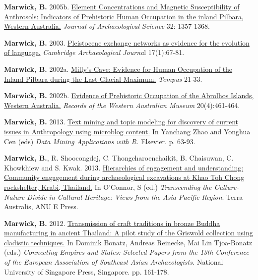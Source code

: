 \documentclass[11pt,article,oneside]{memoir}
\begin{document}
\ind \textbf{Marwick, B.} 2005b. \href{http://faculty.washington.edu/bmarwick/PDFs/Marwick_2005_JAS.pdf}{Element Concentrations and Magnetic Susceptibility of Anthrosols: Indicators of Prehistoric Human Occupation in the inland Pilbara, Western Australia.} \textit{Journal of Archaeological Science} 32: 1357-1368.

\ind \textbf{Marwick, B.} 2003. \href{http://faculty.washington.edu/bmarwick/PDFs/Marwick_2003_CAJ.pdf}{Pleistocene exchange networks as evidence for the evolution of language.} \textit{Cambridge Archaeological Journa}l 17(1):67-81. 

\ind \textbf{Marwick, B.} 2002a. \href{http://faculty.washington.edu/bmarwick/PDFs/Marwick_2002_Tempus.pdf}{Milly’s Cave: Evidence for Human Occupation of the Inland Pilbara during the Last Glacial Maximum.} \textit{Tempus} 21-33.

\ind \textbf{Marwick, B.} 2002b. \href{http://faculty.washington.edu/bmarwick/PDFs/Marwick_2002_RWAM.pdf}{Evidence of Prehistoric Occupation of the Abrolhos Islands, Western Australia.} \textit{Records of the Western Australian Museum} 20(4):461-464.

\bigskip


\ind \textbf{Marwick, B.} 2013. \href{http://faculty.washington.edu/bmarwick/PDFs/Marwick_2013_DMAR.pdf}{Text mining and topic modeling for discovery of current issues in Anthropology using microblog content.} In  Yanchang Zhao and Yonghua Cen (eds) \textit{Data Mining Applications with R.} Elsevier. p. 63-93.

\ind \textbf{Marwick, B.}, R. Shoocongdej, C. Thongcharoenchaikit, B. Chaisuwan, C. Khowkhiew and S. Kwak.  2013. \href{http://faculty.washington.edu/bmarwick/PDFs/Marwick_et_al_2013_community.pdf}{Hierarchies of engagement and understanding: Community engagement during archaeological excavations at Khao Toh Chong rockshelter, Krabi, Thailand.} In O’Connor, S (ed.) \textit{Transcending the Culture-Nature Divide in Cultural Heritage: Views from the Asia-Pacific Region}. Terra Australis, ANU E Press. 

\ind \textbf{Marwick, B.} 2012. \href{http://faculty.washington.edu/bmarwick/PDFs/Marwick_2012_Buddha_cladistics.pdf}{Transmission of craft traditions in bronze Buddha manufacturing in ancient Thailand: A pilot study of the Griswold collection using cladistic techniques.} In Dominik Bonatz, Andreas Reinecke, Mai Lin Tjoa-Bonatz (eds.)\textit{ Connecting Empires and States: Selected Papers from the 13th Conference of the European Association of Southeast Asian Archaeologists.} National University of Singapore Press, Singapore. pp. 161-178. 
\end{document}
